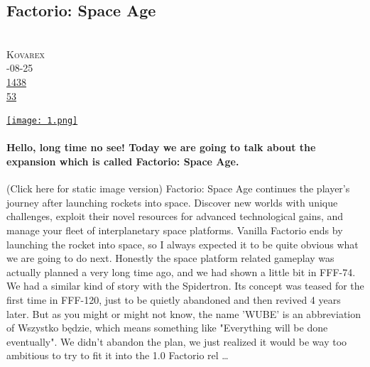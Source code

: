 \documentclass[10pt,a4paper]{article}
\begin{document}
\subsection{Factorio: Space Age}
\noindent\begin{minipage}[t]{0.19\linewidth}
\vspace{0pt}
\noindent\scshape\footnotesize
\\ {\scriptsize\faUser}\space 
Kovarex
\\ {\scriptsize\faCalendar}-08-25
\\ {\scriptsize\faThumbsOUp}\space 
\href{http://news.ycombinator.com/item?id=37260637\&utm\_term=comment}{1438} 
\\ {\scriptsize\faComments}\space 
\href{http://news.ycombinator.com/item?id=37260637\&utm\_term=comment}{53} 
\end{minipage} 
\begin{minipage}[t]{0.80\linewidth}
\vspace{0pt}
\begin{multicols}{2}
    \href{https://factorio.com/blog/post/fff-373?utm\_source=hackernewsletter\&utm\_medium=email\&utm\_term=fav}{
        \texttt{[image: 1.png]}
    }
\paragraph{Hello, long time no see!
Today we are going to talk about the expansion which is called Factorio: Space Age.}

(Click here for static image version)
Factorio: Space Age continues the player's journey after launching rockets into space. Discover new worlds with unique challenges, exploit their novel resources for advanced technological gains, and manage your fleet of interplanetary space platforms.
Vanilla Factorio ends by launching the rocket into space, so I always expected it to be quite obvious what we are going to do next. Honestly the space platform related gameplay was actually planned a very long time ago, and we had shown a little bit in FFF-74. We had a similar kind of story with the Spidertron. Its concept was teased for the first time in FFF-120, just to be quietly abandoned and then revived 4 years later.
But as you might or might not know, the name 'WUBE' is an abbreviation of Wszystko będzie, which means something like "Everything will be done eventually". We didn't abandon the plan, we just realized it would be way too ambitious to try to fit it into the 1.0 Factorio rel
\dots
\end{multicols}
\end{minipage}
\par\medskip
\end{document}
